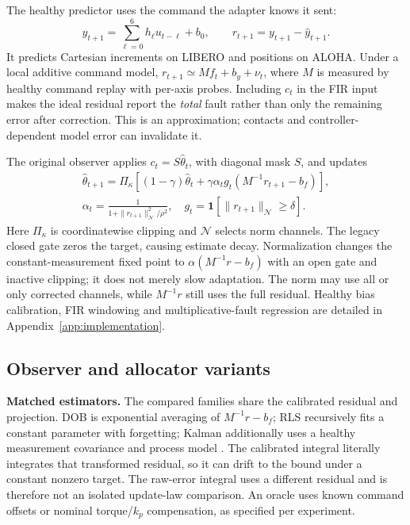 \documentclass{article}
\begin{document}
The healthy predictor uses the command the adapter knows it sent:
\begin{equation}\label{eq:main-residual}
 \hat y_{t+1}=\sum_{\ell=0}^{6}h_\ell u_{t-\ell}+b_0,
 \qquad r_{t+1}=y_{t+1}-\hat y_{t+1}.
\end{equation}
It predicts Cartesian increments on LIBERO and positions on ALOHA. Under a local additive
command model, $r_{t+1}\simeq Mf_t+b_y+\nu_t$, where $M$ is measured by healthy command replay
with per-axis probes. Including $c_t$ in the FIR input makes the ideal residual report the
\emph{total} fault rather than only the remaining error after correction. This is an
approximation; contacts and controller-dependent model error can invalidate it.

The original observer applies $c_t=S\hat\theta_t$, with diagonal mask $S$, and updates
\begin{equation}\label{eq:main-legacy}
\begin{aligned}
 \hat\theta_{t+1}=\Pi_\kappa\!\left[(1-\gamma)\hat\theta_t+
 \gamma\alpha_t g_t(M^{-1}r_{t+1}-b_f)\right],\\
 \alpha_t=\frac{1}{1+\|r_{t+1}\|_{\mathcal N}^2/\rho^2},\quad
 g_t=\mathbf1[\|r_{t+1}\|_{\mathcal N}\ge\delta].
\end{aligned}
\end{equation}
Here $\Pi_\kappa$ is coordinatewise clipping and $\mathcal N$ selects norm channels.
The legacy closed gate zeros the target, causing estimate decay. Normalization changes the
constant-measurement fixed point to $\alpha(M^{-1}r-b_f)$ with an open gate and inactive
clipping; it does not merely slow adaptation.
The norm may use all or only corrected channels, while $M^{-1}r$ still uses the full residual.
Healthy bias calibration, FIR windowing and multiplicative-fault regression are detailed in
Appendix~\ref{app:implementation}.

\subsection{Observer and allocator variants}
\textbf{Matched estimators.} The compared families share the calibrated residual and
projection. DOB is exponential averaging of $M^{-1}r-b_f$; RLS recursively fits a constant
parameter with forgetting; Kalman additionally uses a healthy measurement covariance and
process model \citep{kalman1960}. The calibrated integral literally integrates that transformed residual, so
it can drift to the bound under a constant nonzero target. The raw-error integral uses a
different residual and is therefore not an isolated update-law comparison. An oracle uses
known command offsets or nominal torque/$k_p$ compensation, as specified per experiment.
\end{document}
